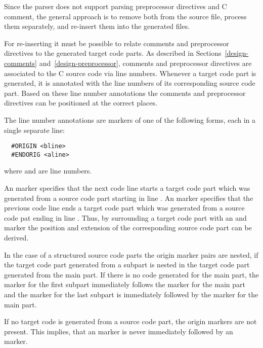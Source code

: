 
Since the  parser does not support parsing preprocessor directives and C comment, the general approach
is to remove both from the source file, process them separately, and re-insert them into the generated files.

For re-inserting it must be possible to relate comments and preprocessor directives to the generated target code parts. As 
described in Sections~\ref{design-comments} and~\ref{design-preprocessor}, comments and preprocessor directives are associated
to the C source code via line numbers. Whenever a target code part is generated, it is annotated with the line numbers of its
corresponding source code part. Based on these line number annotations the comments and preprocessor directives can be
positioned at the correct places.

The line number annotations are markers of one of the following forms, each in a single separate line:
\begin{verbatim}
  #ORIGIN <bline>
  #ENDORIG <aline>
\end{verbatim}
where  and  are line numbers.

An  marker specifies that the next code line starts a target code part which was generated from a source code
part starting in line . An  marker specifies that the previous code line ends a target code part
which was generated from a source code pat ending in line . Thus, by surrounding a target code part with an 
 and  marker the position and extension of the corresponding source code part can be derived.

In the case of a structured source code parts the origin marker pairs are nested, if the target code part generated from a subpart 
is nested in the target code part generated from the main part. If there is no code generated for the main part, the 
 marker for the first subpart immediately follows the  marker for the main part and the 
 marker for the last subpart is immediately followed by the  marker for the main part.

If no target code is generated from a source code part, the origin markers are not present. This implies, that an 
 marker is never immediately followed by an  marker.

